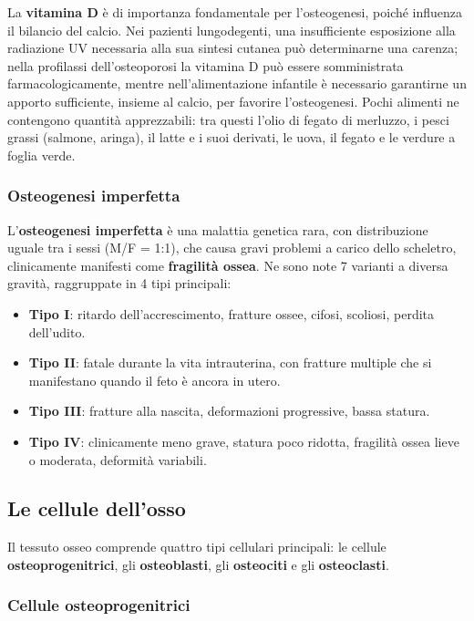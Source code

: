 La \textbf{vitamina D} è di importanza fondamentale per l'osteogenesi,
poiché influenza il bilancio del calcio. Nei pazienti lungodegenti, una
insufficiente esposizione alla radiazione UV necessaria alla sua sintesi
cutanea può determinarne una carenza; nella profilassi dell'osteoporosi la
vitamina D può essere somministrata farmacologicamente, mentre
nell'alimentazione infantile è necessario garantirne un apporto sufficiente,
insieme al calcio, per favorire l'osteogenesi. Pochi alimenti ne contengono
quantità apprezzabili: tra questi l'olio di fegato di merluzzo, i pesci
grassi (salmone, aringa), il latte e i suoi derivati, le uova, il fegato e le
verdure a foglia verde.

\subsubsection{Osteogenesi imperfetta}

L'\textbf{osteogenesi imperfetta} è una malattia genetica rara, con
distribuzione uguale tra i sessi (M/F = 1:1), che causa gravi problemi a
carico dello scheletro, clinicamente manifesti come \textbf{fragilità
ossea}. Ne sono note 7 varianti a diversa gravità, raggruppate in 4 tipi
principali:

\begin{itemize}
  \item \textbf{Tipo I}: ritardo dell'accrescimento, fratture ossee, cifosi,
    scoliosi, perdita dell'udito.
  \item \textbf{Tipo II}: fatale durante la vita intrauterina, con fratture
    multiple che si manifestano quando il feto è ancora in utero.
  \item \textbf{Tipo III}: fratture alla nascita, deformazioni progressive,
    bassa statura.
  \item \textbf{Tipo IV}: clinicamente meno grave, statura poco ridotta,
    fragilità ossea lieve o moderata, deformità variabili.
\end{itemize}

\subsection{Le cellule dell'osso}

Il tessuto osseo comprende quattro tipi cellulari principali: le cellule
\textbf{osteoprogenitrici}, gli \textbf{osteoblasti}, gli \textbf{osteociti}
e gli \textbf{osteoclasti}.

\subsubsection{Cellule osteoprogenitrici}

